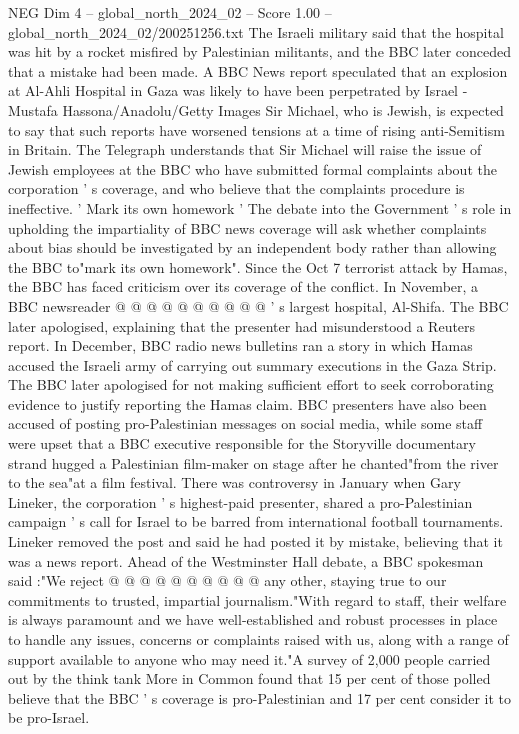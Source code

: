 \begin{textsample}{NEG Dim 4 – global\_north\_2024\_02 – Score 1.00 – global\_north\_2024\_02/200251256.txt}  \label{ex:f4_neg_276}
The Israeli military said that the hospital was hit by a rocket misfired by Palestinian militants, and the BBC later conceded that a mistake had been made.
A BBC News report speculated that an explosion at Al-Ahli Hospital in Gaza was likely to have been perpetrated by Israel - Mustafa Hassona/Anadolu/Getty Images Sir Michael, who is Jewish, is expected to say that such reports have worsened tensions at a time of rising anti-Semitism in Britain.
The Telegraph understands that Sir Michael will raise the issue of Jewish employees at the BBC who have submitted formal complaints about the corporation ' s coverage, and who believe that the complaints procedure is ineffective. ' Mark its own homework ' The debate into the Government ' s role in upholding the impartiality of BBC news coverage will ask whether complaints about bias should be investigated by an independent body rather than allowing the BBC to"mark its own homework".
Since the Oct 7 terrorist attack by Hamas, the BBC has faced criticism over its coverage of the conflict.
In November, a BBC newsreader @ @ @ @ @ @ @ @ @ @ ' s largest hospital, Al-Shifa.
The BBC later apologised, explaining that the presenter had misunderstood a Reuters report.
In December, BBC radio news bulletins ran a story in which Hamas accused the Israeli army of carrying out summary executions in the Gaza Strip.
The BBC later apologised for not making sufficient effort to seek corroborating evidence to justify reporting the Hamas claim.
BBC presenters have also been accused of posting pro-Palestinian messages on social media, while some staff were upset that a BBC executive responsible for the Storyville documentary strand hugged a Palestinian film-maker on stage after he chanted"from the river to the sea"at a film festival.
There was controversy in January when Gary Lineker, the corporation ' s highest-paid presenter, shared a pro-Palestinian campaign ' s call for Israel to be barred from international football tournaments.
Lineker removed the post and said he had posted it by mistake, believing that it was a news report.
Ahead of the Westminster Hall debate, a BBC spokesman said :"We reject @ @ @ @ @ @ @ @ @ @ any other, staying true to our commitments to trusted, impartial journalism."With regard to staff, their welfare is always paramount and we have well-established and robust processes in place to handle any issues, concerns or complaints raised with us, along with a range of support available to anyone who may need it."A survey of 2,000 people carried out by the think tank More in Common found that 15 per cent of those polled believe that the BBC ' s coverage is pro-Palestinian and 17 per cent consider it to be pro-Israel.

\end{textsample}
